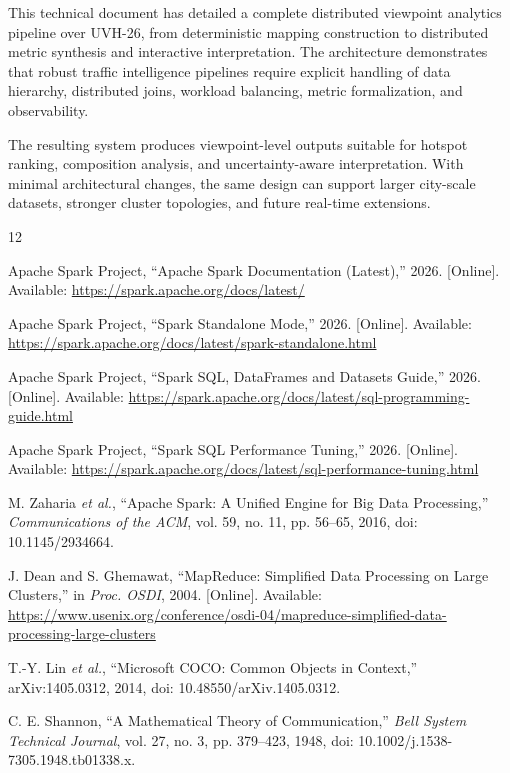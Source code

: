 \documentclass[journal,onecolumn]{IEEEtran}
\begin{document}
This technical document has detailed a complete distributed viewpoint analytics pipeline over UVH-26, from deterministic mapping construction to distributed metric synthesis and interactive interpretation. The architecture demonstrates that robust traffic intelligence pipelines require explicit handling of data hierarchy, distributed joins, workload balancing, metric formalization, and observability.

The resulting system produces viewpoint-level outputs suitable for hotspot ranking, composition analysis, and uncertainty-aware interpretation. With minimal architectural changes, the same design can support larger city-scale datasets, stronger cluster topologies, and future real-time extensions.

\begin{thebibliography}{12}

Apache Spark Project, ``Apache Spark Documentation (Latest),'' 2026. [Online]. Available: \url{https://spark.apache.org/docs/latest/}

Apache Spark Project, ``Spark Standalone Mode,'' 2026. [Online]. Available: \url{https://spark.apache.org/docs/latest/spark-standalone.html}

Apache Spark Project, ``Spark SQL, DataFrames and Datasets Guide,'' 2026. [Online]. Available: \url{https://spark.apache.org/docs/latest/sql-programming-guide.html}

Apache Spark Project, ``Spark SQL Performance Tuning,'' 2026. [Online]. Available: \url{https://spark.apache.org/docs/latest/sql-performance-tuning.html}

M. Zaharia \emph{et al.}, ``Apache Spark: A Unified Engine for Big Data Processing,'' \emph{Communications of the ACM}, vol. 59, no. 11, pp. 56--65, 2016, doi: 10.1145/2934664.

J. Dean and S. Ghemawat, ``MapReduce: Simplified Data Processing on Large Clusters,'' in \emph{Proc. OSDI}, 2004. [Online]. Available: \url{https://www.usenix.org/conference/osdi-04/mapreduce-simplified-data-processing-large-clusters}

T.-Y. Lin \emph{et al.}, ``Microsoft COCO: Common Objects in Context,'' arXiv:1405.0312, 2014, doi: 10.48550/arXiv.1405.0312.

C. E. Shannon, ``A Mathematical Theory of Communication,'' \emph{Bell System Technical Journal}, vol. 27, no. 3, pp. 379--423, 1948, doi: 10.1002/j.1538-7305.1948.tb01338.x.


\end{thebibliography}
\end{document}

